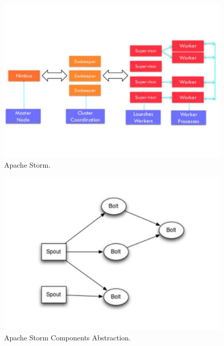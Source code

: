 \begin{figure}[t]
	\vspace{-1.5cm}
	\centering
	\includegraphics[width=\columnwidth]{Images/apache_storm.pdf}
	\vspace{-2cm}
	\caption[Apache Storm.]{Apache Storm.}
	\label{fig:apache_storm}
\end{figure}
\begin{figure}
	\vspace{-0.5cm}
	\centering
	\includegraphics[width=\columnwidth]{Images/apache_storm_components_abstraction.pdf}
	\vspace{-1.5cm}
	\caption[Apache Storm Components Abstraction.]{Apache Storm Components Abstraction.}
	\label{fig:apache_storm_components_abstraction}
\end{figure}

